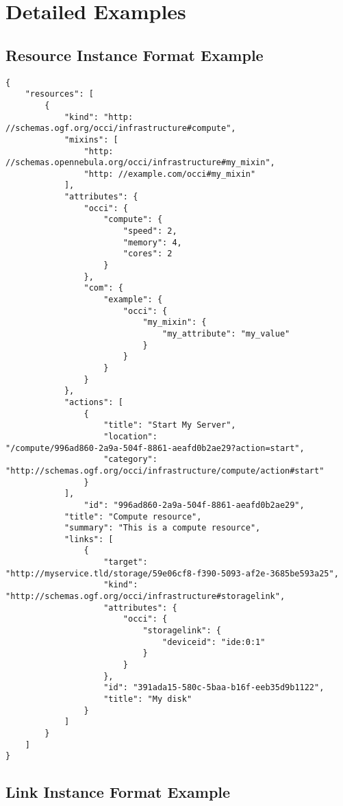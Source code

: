 \documentclass[10pt,a4paper]{article}
\begin{document}
\section{Detailed Examples}
\label{sec:examples}


\subsection{Resource Instance Format Example}
\label{sec:example_resource}

\begin{verbatim}
{
    "resources": [
        {
            "kind": "http: //schemas.ogf.org/occi/infrastructure#compute",
            "mixins": [
                "http: //schemas.opennebula.org/occi/infrastructure#my_mixin",
                "http: //example.com/occi#my_mixin"
            ],
            "attributes": {
                "occi": {
                    "compute": {
                        "speed": 2,
                        "memory": 4,
                        "cores": 2
                    }
                },
                "com": {
                    "example": {
                        "occi": {
                            "my_mixin": {
                                "my_attribute": "my_value"
                            }
                        }
                    }
                }
            },
            "actions": [
                {
                    "title": "Start My Server",
                    "location":
"/compute/996ad860-2a9a-504f-8861-aeafd0b2ae29?action=start",
                    "category":
"http://schemas.ogf.org/occi/infrastructure/compute/action#start"
                }
            ],
            	"id": "996ad860-2a9a-504f-8861-aeafd0b2ae29",
		    "title": "Compute resource",
		    "summary": "This is a compute resource",
		    "links": [
		        {
		            "target":
"http://myservice.tld/storage/59e06cf8-f390-5093-af2e-3685be593a25",
		            "kind":
"http://schemas.ogf.org/occi/infrastructure#storagelink",
		            "attributes": {
		                "occi": {
		                    "storagelink": {
		                        "deviceid": "ide:0:1"
		                    }
		                }
		            },
		            "id": "391ada15-580c-5baa-b16f-eeb35d9b1122",
		            "title": "My disk"
		        }
		    ]
        }
    ]
}
\end{verbatim}

\subsection{Link Instance Format Example}
\label{sec:example_link}
\end{document}
